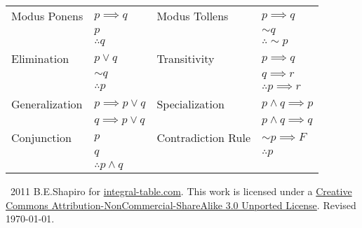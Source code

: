 \documentclass[10pt,letterpaper]{article}
\newcommand{\AND}{\wedge}
\newcommand{\OR}{\vee}
\begin{document}
\begin{doublespace}
\begin{center}
\begin{tabular}{|ll|ll|}
\hline
Modus Ponens & $p\implies q$  & Modus Tollens & $p\implies q$\\
             & $p$            &               & $\sim q$ \\ 
             & $\therefore q$ &               & $\therefore \sim p$ \\ 
             \hline
Elimination  & $p \OR q$      & Transitivity  & $p \implies q$ \\
             & $\sim q$       &               & $q \implies r$ \\
             & $\therefore p$ &               & $\therefore p \implies r$ \\
             \hline
Generalization & $p \implies p\OR q$ & Specialization & $p \AND q \implies p$ \\
               & $q \implies p\OR q$ &                & $p \AND q \implies q$ \\
             
\hline
Conjunction   &  $p$                          & Contradiction Rule & $\sim p \implies F$ \\
              &  $q$                          &                    & $\therefore p $\\
              &  $\therefore p \AND q$        & &\\
              \hline

\end{tabular}
 
\end{center}
\end{doublespace}

\vspace{1.5cm}
\begin{small}
\noindent \textcopyleft\ 2011 B.E.Shapiro for \href{http://integral-table.com}{integral-table.com}. This work is licensed under a \href{http://creativecommons.org/licenses/by-nc-sa/3.0/}{Creative Commons Attribution-NonCommercial-ShareAlike 3.0 Unported License}. Revised \today. 
\end{small}
\end{document}
